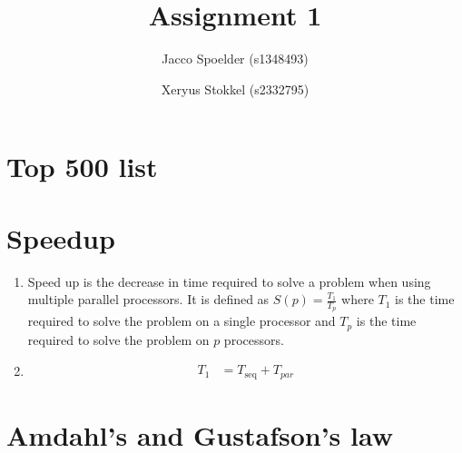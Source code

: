 \documentclass[a4paper]{article}
\title{Assignment 1}
\author{Jacco Spoelder (s1348493) \and Xeryus Stokkel (s2332795)}
\begin{document}
\maketitle

\section{Top 500 list}

\section{Speedup}
\begin{enumerate}[\textbf{(a)}]
	\item Speed up is the decrease in time required to solve a problem when using multiple parallel processors. It is defined as $S(p) = \frac{T_1}{T_p}$ where $T_1$ is the time required to solve the problem on a single processor and $T_p$ is the time required to solve the problem on $p$ processors.
	\item
		\begin{align}
			T_1 &= T_\text{seq} + T_{par}
		\end{align}
\end{enumerate}

\section{Amdahl's and Gustafson's law}
\end{document}
